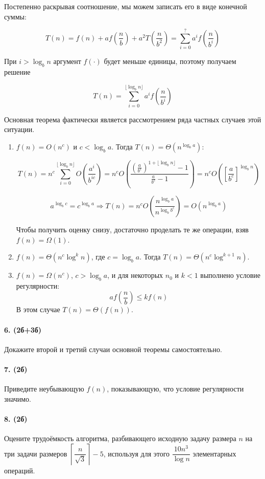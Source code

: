 \documentclass{article}
\begin{document}
Постепенно раскрывая соотношение, мы можем записать его в виде конечной суммы:

$$T(n)=f(n)+af\left(\dfrac n b\right)+a^2T\left(\dfrac{n}{b^2}\right)=\sum\limits_{i=0}^? a^i f\left(\dfrac{n}{b^i}\right)$$

При $i > \log_b n$ аргумент $f(\cdot)$ будет меньше единицы, поэтому получаем решение

$$T(n) = \sum\limits_{i=0}^{\lfloor\log_b n \rfloor}a^if\left(\dfrac n {b^i}\right)$$

Основная теорема фактически является рассмотрением ряда частных случаев этой ситуации.

\begin{enumerate}
    \item $f(n) = O(n^c)$ и $c < \log_b a$. Тогда $T(n) = \Theta(n^{\log_b a})$:
    
    $$T(n)=n^c \sum\limits_{i=0}^{\lfloor \log_b n \rfloor} O\left(\dfrac{a^i}{b^{ic}}\right)=n^cO\left(\dfrac{\left(\tfrac{a}{b^c}\right)^{1+\lfloor \log_b n\rfloor}-1}{\tfrac{a}{b^c}-1}\right)=n^c O\left(\left[\dfrac{a}{b^c}\right]^{\log_b n}\right)$$
    
    $$a^{\log_b c} = c^{\log_b a} \Longrightarrow T(n) = n^c O\left(\dfrac{n^{\log_b a}}{n^{\log_b b^c}}\right) = O(n^{\log_b a})$$
    
    Чтобы получить оценку снизу, достаточно проделать те же операции, взяв $f(n) = \Omega(1)$.
    \item $f(n)=\Theta(n^c \log^k n)$, где $c=\log_b a$. Тогда $T(n) = \Theta(n^c \log^{k+1}n)$.
    \item $f(n)=\Omega(n^c)$, $c>\log_b a$, и для некоторых $n_0$ и $k<1$ выполнено условие регулярности: $$af\left(\dfrac n b\right) \leq kf(n)$$ 
    В этом случае $T(n) = \Theta(f(n))$. 
\end{enumerate}

\paragraph{6. (2б+3б)} Докажите второй и третий случаи основной теоремы самостоятельно.

\paragraph{7. (2б)} Приведите неубывающую $f(n)$, показывающую, что условие регулярности значимо.

\paragraph{8. (2б)} Оцените трудоёмкость алгоритма, разбивающего исходную задачу размера $n$ на три задачи размеров $\left \lceil\dfrac{n}{\sqrt{3}} \right\rceil - 5$, используя для этого $\dfrac{10n^3}{\log n}$ элементарных операций.
\end{document}
